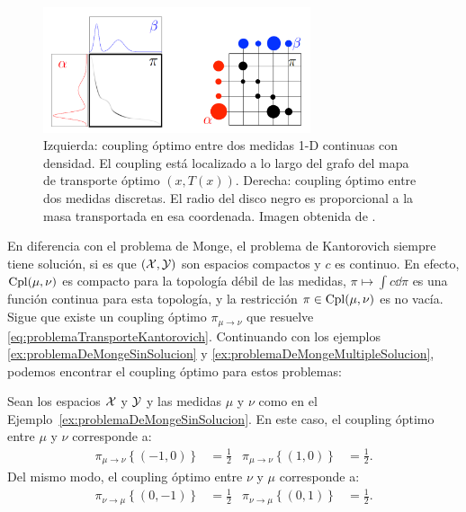 {{	  \begin{figure}[htbp]
		  \centering
		  \includegraphics[width=0.7\textwidth]{img/transporte/coupling-example.png}
		  \caption{Izquierda: coupling óptimo entre dos medidas 1-D continuas con densidad. El coupling está localizado a lo largo del grafo del mapa de transporte óptimo $(x, T(x))$. Derecha: coupling óptimo entre dos medidas discretas. El radio del disco negro es proporcional a la masa transportada en esa coordenada. Imagen obtenida de \cite{peyre2019computational}.
			  \label{fig:coupling-example}}
	  \end{figure}


	  En diferencia con el problema de Monge, el problema de Kantorovich siempre tiene solución, si es que $(\mathcal{X}, \mathcal{Y})$ son espacios compactos y $c$ es continuo. En efecto, $\operatorname{Cpl}(\mu, \nu)$ es compacto para la topología débil de las medidas, $\pi \mapsto \int c\dd{\pi}$ es una función continua para esta topología, y la restricción $\pi\in\operatorname{Cpl}(\mu, \nu)$ es no vacía. Sigue que existe un coupling óptimo $\pi_{\mu \to \nu}$ que resuelve \eqref{eq:problemaTransporteKantorovich}. Continuando con los ejemplos \ref*{ex:problemaDeMongeSinSolucion} y \ref*{ex:problemaDeMongeMultipleSolucion}, podemos encontrar el coupling óptimo para estos problemas:

	  \begin{example}
		  Sean los espacios $\mathcal{X}$ y $\mathcal{Y}$ y las medidas $\mu$ y $\nu$ como en el Ejemplo~\ref*{ex:problemaDeMongeSinSolucion}. En este caso, el coupling óptimo entre $\mu$ y $\nu$ corresponde a:
		  \begin{align*}
			  \pi_{\mu \to \nu}\left\{ (-1, 0) \right\} & = \frac{1}{2} & \pi_{\mu \to \nu}\left\{ (1, 0) \right\} & = \frac{1}{2}.
		  \end{align*}
		  Del mismo modo, el coupling óptimo entre $\nu$ y $\mu$ corresponde a:
		  \begin{align*}
			  \pi_{\nu \to \mu}\left\{ (0, -1) \right\} & = \frac{1}{2} & \pi_{\nu \to \mu}\left\{ (0, 1) \right\} & = \frac{1}{2}.
		  \end{align*}


\end{example}}}
